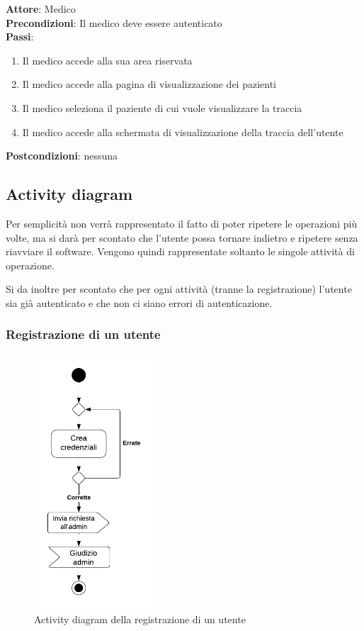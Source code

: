 \documentclass[a4paper]{article}
\begin{document}
\begin{mdframed}
  \textbf{Attore}: Medico\\
  \textbf{Precondizioni}: Il medico deve essere autenticato\\
  \textbf{Passi}: 
  \begin{enumerate}[nosep]
    \item Il medico accede alla sua area riservata
    \item Il medico accede alla pagina di visualizzazione dei pazienti
    \item Il medico seleziona il paziente di cui vuole visualizzare la traccia
    \item Il medico accede alla schermata di visualizzazione della traccia dell'utente
  \end{enumerate}
  \textbf{Postcondizioni}: nessuna
\end{mdframed}


\subsection{Activity diagram}

Per semplicità non verrà rappresentato il fatto di poter ripetere le operazioni più volte,
ma si darà per scontato che l'utente possa tornare indietro e ripetere senza riavviare
il software. Vengono quindi rappresentate soltanto le singole attività di operazione.

Si da inoltre per scontato che per ogni attività (tranne la registrazione) l'utente sia
già autenticato e che non ci siano errori di autenticazione.

\subsubsection{Registrazione di un utente}

\begin{figure}[H]
  \begin{center}
    \includegraphics[width=0.4\textwidth]{adRegistrazione}
  \end{center}
  \caption{Activity diagram della registrazione di un utente}
  \label{fig:adRegistrazione}
\end{figure}
\end{document}
